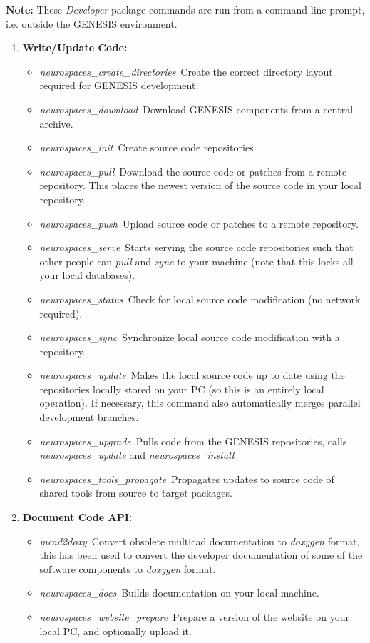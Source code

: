 \documentclass[12pt]{article}
\begin{document}
{\bf Note:} These {\it Developer} package commands are run from a command line prompt, i.e. outside the GENESIS environment.

\begin{enumerate}
   \item {\bf Write/Update Code:}
   \begin{itemize}
      \item {\it neurospaces\_create\_directories}\,\,\,Create the correct directory layout required for GENESIS development.
      \item {\it neurospaces\_download}\,\,\,Download GENESIS components from a central archive.
      \item {\it neurospaces\_init}\,\,\,Create source code repositories.
      \item {\it neurospaces\_pull}\,\,\,Download the source code or patches from a remote repository. This places the newest version of the source 
      code in your local repository.
      \item {\it neurospaces\_push}\,\,\,Upload source code or patches to a remote repository.
      \item {\it neurospaces\_serve}\,\,\,Starts serving the source code repositories such that other people can {\it pull} and {\it sync} to your machine (note that this locks all your local databases).
      \item {\it neurospaces\_status}\,\,\,Check for local source code modification (no network required).
      \item {\it neurospaces\_sync}\,\,\,Synchronize local source code modification with a repository.
      \item {\it neurospaces\_update}\,\,\,Makes the local source code up to date using the repositories locally stored on your PC (so this is an entirely local operation). If necessary, this command also automatically merges parallel development branches.
      \item {\it neurospaces\_upgrade}\,\,\,Pulls code from the GENESIS repositories, calls {\it neurospaces\_update} and {\it neurospaces\_install}
      \item {\it neurospaces\_tools\_propagate}\,\,\,Propagates updates to source code of shared tools from source to target packages.
   \end{itemize}
  
   \item{\bf Document Code API:}
   \begin{itemize}
   \item {\it mcad2doxy}\,\,\,Convert obsolete multicad documentation
     to {\it doxygen} format, this has been used to convert the
     developer documentation of some of the software components to
     {\it doxygen} format.
      \item {\it neurospaces\_docs}\,\,\,Builds documentation on your local machine.
      \item {\it neurospaces\_website\_prepare}\,\,\,Prepare a version of the website on your local PC, and optionally upload it. 
   \end{itemize}
  

\end{enumerate}
\end{document}

